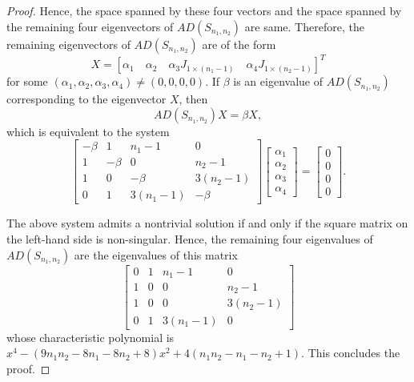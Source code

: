 \documentclass[12pt]{article}
\numberwithin{equation}{section}
\begin{document}
\begin{proof}
	
	 
	 Hence, the space spanned by these four vectors and the space spanned by the remaining four eigenvectors of $AD(S_{n_1,n_2})$ are same. Therefore, the remaining eigenvectors of $AD(S_{n_1,n_2})$ are of the form 	  $$X=\left[
	 \alpha_1 \quad \alpha_2 \quad \alpha_3J_{1 \times (n_1-1)} \quad \alpha_4 J_{1 \times (n_2-1)}
	 \right]^T$$ for some $(\alpha_1, \alpha_2, \alpha_3, \alpha_4) \neq (0,0,0,0)$.  	 
	 If $\beta$ is an eigenvalue of $AD(S_{n_1,n_2})$ corresponding to the eigenvector $X$, then \[AD(S_{n_1,n_2})X = \beta X, \]	 
%	 
	 which is equivalent to the system 	 
	 \[\begin{bmatrix}
	 -\beta & 1  & n_1-1 & 0\\
	 1 &  -\beta & 0 & n_2-1\\
	 1 & 0 & -\beta & 3(n_2-1)\\
	 0 & 1 & 3(n_1-1) & -\beta
	 \end{bmatrix} 
	 \begin{bmatrix}
	 \alpha_1 \\ \alpha_2 \\ \alpha_3 \\ \alpha_4
	 \end{bmatrix} = 
	 \begin{bmatrix}
	  0 \\ 0 \\ 0 \\ 0
	 \end{bmatrix}.\] 
	 
	 The above system admits a nontrivial solution if and only if the square matrix on the left-hand side is non-singular. Hence, the remaining four eigenvalues of $AD(S_{n_1,n_2})$ are the eigenvalues of this matrix
	 \[\begin{bmatrix}
	 	0 & 1 & n_1-1 & 0\\
	 	1 & 0 & 0 & n_2-1\\
	 	1 & 0 & 0 & 3(n_2-1)\\
	 	0 & 1 & 3(n_1-1) & 0
	 \end{bmatrix}\]
	 whose characteristic polynomial is $x^4-\left(9n_1n_2-8n_1-8n_2+8\right)x^2+4\left(n_1n_2-n_1-n_2+1\right)$.
	 This concludes the proof.	 
	\end{proof}
	
\end{document}
